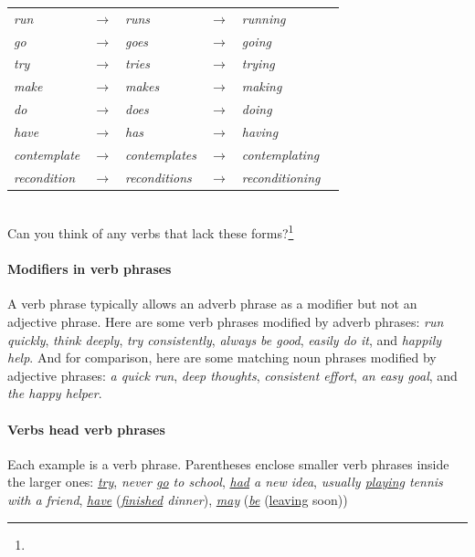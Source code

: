 \begin{tabular}{@{} l l l l l l}
    \textit{run} & $\rightarrow$ & \textit{runs} & $\rightarrow$ & \textit{running} & \\
    \textit{go} & $\rightarrow$ & \textit{goes} & $\rightarrow$ & \textit{going} & \\
    \textit{try} & $\rightarrow$ & \textit{tries} & $\rightarrow$ & \textit{trying} & \\
    \textit{make} & $\rightarrow$ & \textit{makes} & $\rightarrow$ & \textit{making} & \\
    \textit{do} & $\rightarrow$ & \textit{does} & $\rightarrow$ & \textit{doing} & \\
    \textit{have} & $\rightarrow$ & \textit{has} & $\rightarrow$ & \textit{having} & \\
    \textit{contemplate} & $\rightarrow$ & \textit{contemplates} & $\rightarrow$ & \textit{contemplating} & \\
    \textit{recondition} & $\rightarrow$ & \textit{reconditions} & $\rightarrow$ & \textit{reconditioning} & \\
\end{tabular}\\

Can you think of any verbs that lack these forms?\footnote{
}

\paragraph*{Modifiers in verb phrases}
A verb phrase typically allows an adverb phrase as a modifier but not an adjective phrase. Here are some verb phrases modified by adverb phrases:  \textit{run quickly}, \textit{think deeply}, \textit{try consistently}, \textit{always be good}, \textit{easily do it}, and \textit{happily help}. And for comparison, here are some matching noun phrases modified by adjective phrases:  \textit{a quick run}, \textit{deep thoughts}, \textit{consistent effort}, \textit{an easy goal}, and \textit{the happy helper}.

\paragraph*{Verbs head verb phrases}
Each example is a verb phrase. Parentheses enclose smaller verb phrases inside the larger ones: \textit{\uline{try}}, \textit{never \uline{go} to school}, \textit{\uline{had} a new idea}, \textit{usually \uline{playing} tennis with a friend}, \textit{\uline{have} }(\textit{\uline{finished} dinner}), \textit{\uline{may} }(\textit{\uline{be} }(\uline{leaving} soon))

